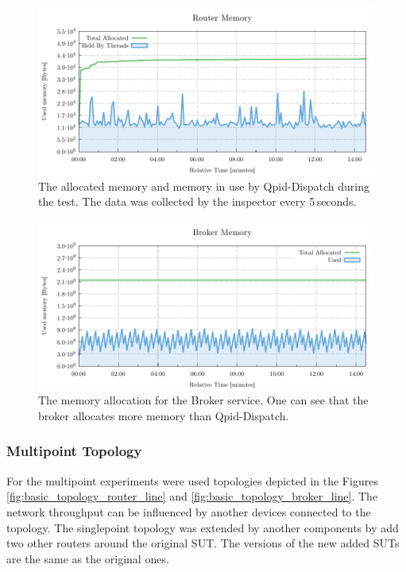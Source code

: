 \begin{figure}[H]
	\centering
	\includegraphics[width=1\linewidth]{obrazky-figures/charts/singlepoint-router-throughput-memory.pdf}
	\caption{The allocated memory and memory in use by Qpid-Dispatch during the test. The data was collected by the inspector every 5\,seconds.}
	\label{fig:router-single-memory}
\end{figure}

\begin{figure}[H]
	\centering
	\includegraphics[width=1\linewidth]{obrazky-figures/charts/singlepoint-broker-throughput-memory.pdf}
	\caption{The memory allocation for the Broker service. One can see that the broker allocates more memory than Qpid-Dispatch.}
	\label{fig:broker-single-memory}
\end{figure}


\subsubsection*{Multipoint Topology}
For the multipoint experiments were used topologies depicted in the Figures \ref{fig:basic_topology_router_line} and \ref{fig:basic_topology_broker_line}. The network throughput can be influenced by another devices connected to the topology. The singlepoint topology was extended by another components by add two other routers around the original SUT. The versions of the new added SUTs are the same as the original ones.

